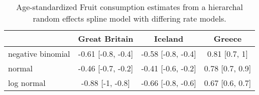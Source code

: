    \begin{table}[h]
        \begin{center}
        \begin{tabular}{|p{1.7cm}|c|c|c|}
            \hline
                & Great Britain & Iceland & Greece \\
            \hline
                negative binomial & -0.61 [-0.8, -0.4] & -0.58 [-0.8, -0.4] & 0.81 [0.7, 1] \\
                normal & -0.46 [-0.7, -0.2] & -0.41 [-0.6, -0.2] & 0.78 [0.7, 0.9] \\
                log normal & -0.88 [-1, -0.8] & -0.66 [-0.8, -0.6] & 0.67 [0.6, 0.7] \\
            \hline
        \end{tabular}
        \end{center}
        \caption{ Age-standardized Fruit consumption estimates
          from a hierarchal random effects spline model with differing
          rate models.}
        \label{tab:app-fruit rfx}
    \end{table}



